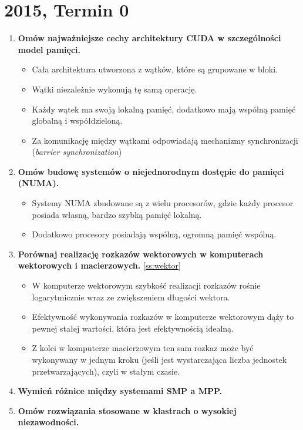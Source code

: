 	\section{2015, Termin 0}
		\begin{enumerate}
			\item \textbf{Omów najważniejsze cechy architektury CUDA w szczególności model pamięci.}
				\begin{itemize}
					\item Cała architektura utworzona z wątków, które są grupowane w bloki.
					\item Wątki niezależnie wykonują tę samą operację.
					\item Każdy wątek ma swoją lokalną pamięć, dodatkowo mają wspólną pamięć globalną i współdzieloną.
					\item Za komunikację między wątkami odpowiadają mechanizmy synchronizacji (\emph{barrier synchronization})
				\end{itemize}
			\item \textbf{Omów budowę systemów o niejednorodnym dostępie do pamięci (NUMA).}
			\begin{itemize}
				\item Systemy NUMA zbudowane są z wielu procesorów, gdzie każdy procesor posiada własną, bardzo szybką pamięć lokalną.
				\item Dodatkowo procesory posiadają wspólną, ogromną pamięć wspólną.
			\end{itemize}
			\item \textbf{Porównaj realizację rozkazów wektorowych w komputerach wektorowych i macierzowych.}
			\ref{ss:wektor}
			\begin{itemize}
				\item W komputerze wektorowym szybkość realizacji rozkazów rośnie logarytmicznie wraz ze zwiększeniem długości wektora.
				\item Efektywność wykonywania rozkazów w komputerze wektorowym dąży to pewnej stałej wartości, która jest efektywnością idealną.
				\item Z kolei w komputerze macierzowym ten sam rozkaz może być wykonywany w jednym kroku (jeśli jest wystarczająca liczba jednostek przetwarzających), czyli w stałym czasie.
			\end{itemize}
			\item \textbf{Wymień różnice między systemami SMP a MPP.}
			\item \textbf{Omów rozwiązania stosowane w klastrach o wysokiej niezawodności.}
		\end{enumerate}